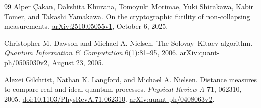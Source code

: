 \documentclass[11pt]{article}
\theoremstyle{remark}
\begin{document}
\begin{thebibliography}{99}
Alper \c{C}akan, Dakshita Khurana, Tomoyuki Morimae, Yuki Shirakawa,
Kabir Tomer, and Takashi Yamakawa.
On the cryptographic futility of non-collapsing measurements.
\href{https://arxiv.org/abs/2510.05055v1}{arXiv:2510.05055v1}, October 6, 2025.

Christopher M. Dawson and Michael A. Nielsen.
The Solovay--Kitaev algorithm.
\emph{Quantum Information \& Computation} 6(1):81--95, 2006.
\href{https://arxiv.org/abs/quant-ph/0505030v2}{arXiv:quant-ph/0505030v2},
August 23, 2005.

Alexei Gilchrist, Nathan K. Langford, and Michael A. Nielsen.
Distance measures to compare real and ideal quantum processes.
\emph{Physical Review A} 71, 062310, 2005.
\href{https://doi.org/10.1103/PhysRevA.71.062310}{doi:10.1103/PhysRevA.71.062310}.
\href{https://arxiv.org/abs/quant-ph/0408063v2}{arXiv:quant-ph/0408063v2}.
\end{thebibliography}
\end{document}
